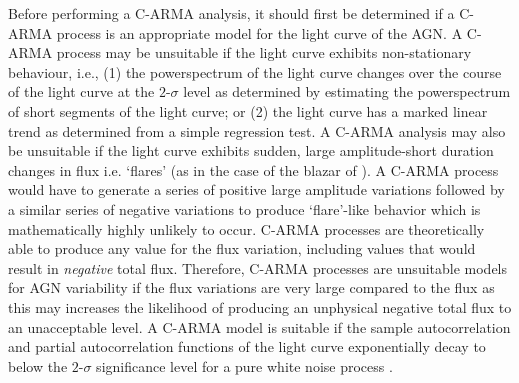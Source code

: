 \documentclass[a4paper,fleqn,usenatbib]{mnras}
\begin{document}
Before performing a C-ARMA analysis, it should first be determined if a C-ARMA process is an appropriate model for the light curve of the AGN. A C-ARMA process may be unsuitable if the light curve exhibits non-stationary behaviour, i.e., (1) the powerspectrum of the light curve changes over the course of the light curve at the $2$-$\sigma$ level as determined by estimating the powerspectrum of short segments of the light curve; or (2) the light curve has a marked linear trend as determined from a simple regression test. A C-ARMA analysis may also be unsuitable if the light curve exhibits sudden, large amplitude-short duration changes in flux i.e. `flares' (as in the case of the blazar of \citealp{Edelson13}). A C-ARMA process would have to generate a series of positive large amplitude variations followed by a similar series of negative variations to produce `flare'-like behavior which is mathematically highly unlikely to occur. C-ARMA processes are theoretically able to produce any value for the flux variation, including values that would result in \textit{negative} total flux. Therefore, C-ARMA processes are unsuitable models for AGN variability if the flux variations are very large compared to the flux as this may increases the likelihood of producing an unphysical negative total flux to an unacceptable level. A C-ARMA model is suitable if the sample autocorrelation and partial autocorrelation functions of the light curve exponentially decay to below the $2$-$\sigma$ significance level for a pure white noise process \citep{BrockwellDavisITSF}.
\end{document}
